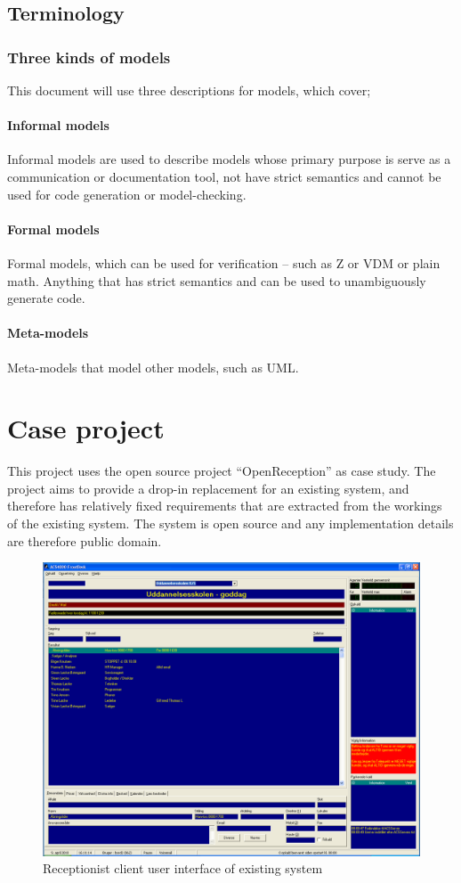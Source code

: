 \documentclass[10pt]{scrreprt}
\begin{document}
\section{Terminology}
\subsection{Three kinds of models}
This document will use three descriptions for models, which cover;
\subsubsection{Informal models}
Informal models are used to describe models whose primary purpose is serve as a communication or documentation tool, not have strict semantics and cannot be used for code generation or model-checking.
\subsubsection{Formal models}
Formal models, which can be used for verification -- such as Z or VDM or plain math. Anything that has strict semantics and can be used to unambiguously generate code.
\subsubsection{Meta-models}
Meta-models that model other models, such as UML.


\chapter{Case project}
This project uses the open source project ``OpenReception'' as case study. The project aims to provide a drop-in replacement for an existing system, and therefore has relatively fixed requirements that are extracted from the workings of the existing system. The system is open source and any implementation details are therefore public domain.


\begin{figure}
  \centering
 
  \includegraphics[scale=0.2]{img/frontdesk-client-ui.png}
  \caption{Receptionist client user interface of existing system}
  \label{fig:frontdesk-client-ui}
\end{figure}
\end{document}
